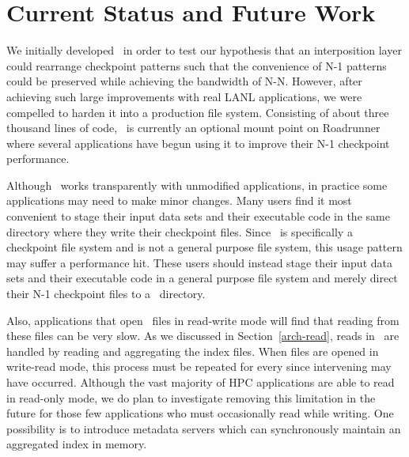 \section{Current Status and Future Work}
\label{future}

We initially developed \plfs\ in order to test our hypothesis that an
interposition layer could rearrange checkpoint patterns such that the
convenience of N-1 patterns could be preserved while achieving the bandwidth of
N-N.  However, after achieving such large improvements with real LANL
applications, we were compelled to harden it 
into a production file system. Consisting of about three thousand lines of
code, \plfs\ is currently an optional mount point on Roadrunner where several
applications have begun using it to improve their N-1 checkpoint performance. 


Although \plfs\ works transparently with unmodified applications, in practice
some applications may need to make minor changes.  Many users find it most
convenient to stage their input data sets and their executable code in the same
directory where they write their checkpoint files.  Since \plfs\ is
specifically a checkpoint file system and is not a general purpose file system,
this usage pattern may suffer a performance hit.  These users should instead
stage their input data sets and their executable code in a general purpose file
system and merely direct their N-1 checkpoint files to a \plfs\ directory.

Also, applications that open \plfs\ files in read-write mode will find that
reading from these files can be very slow.  As we discussed in
Section~\ref{arch-read}, reads in \plfs\ are handled by reading and aggregating
the index files.  When files are opened in write-read mode, this process must
be repeated for every  since intervening  may
have occurred.  Although the vast majority of HPC applications are able to read
in read-only mode, we do plan to investigate removing this limitation in the
future for those few applications who must occasionally read while writing.
One possibility is to introduce metadata servers which can synchronously
maintain an aggregated index in memory. 

